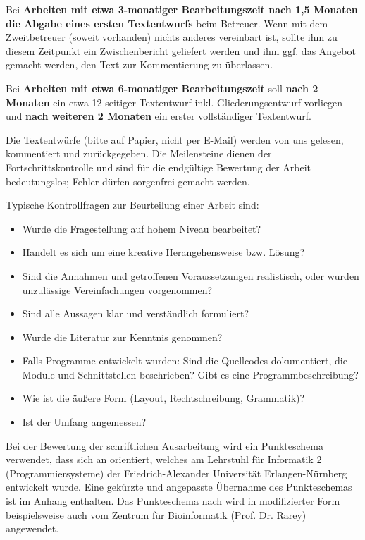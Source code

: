 \documentclass[12pt]{scrartcl}
\begin{document}
Bei \textbf{Arbeiten mit etwa 3-monatiger Bearbeitungszeit nach 1,5 Monaten die Abgabe eines ersten Textentwurfs} beim Betreuer. Wenn mit dem Zweitbetreuer (soweit vorhanden) nichts anderes vereinbart ist, sollte ihm zu diesem Zeitpunkt ein Zwischenbericht geliefert werden und ihm ggf. das Angebot gemacht werden, den Text zur Kommentierung zu überlassen.

Bei \textbf{Arbeiten mit etwa 6-monatiger Bearbeitungszeit} soll \textbf{nach 2 Monaten} ein etwa 12-seitiger Textentwurf inkl. Gliederungsentwurf vorliegen und \textbf{nach weiteren 2 Monaten} ein erster vollständiger Textentwurf. 

Die Textentwürfe (bitte auf Papier, nicht per E-Mail) werden von uns gelesen, kommentiert und zurückgegeben. Die Meilensteine dienen der Fortschrittskontrolle und sind für die endgültige Bewertung der Arbeit bedeutungslos; Fehler dürfen sorgenfrei gemacht werden.

Typische Kontrollfragen zur Beurteilung einer Arbeit sind:
\begin{itemize}
\item Wurde die Fragestellung auf hohem Niveau bearbeitet?
\item Handelt es sich um eine kreative Herangehensweise bzw. Lösung?
\item Sind die Annahmen und getroffenen Voraussetzungen realistisch, oder wurden unzulässige Vereinfachungen vorgenommen?
\item Sind alle Aussagen klar und verständlich formuliert?
\item Wurde die Literatur zur Kenntnis genommen?
\item Falls Programme entwickelt wurden: Sind die Quellcodes dokumentiert, die Module und Schnittstellen beschrieben? Gibt es eine Programmbeschreibung? 
\item Wie ist die äußere Form (Layout, Rechtschreibung, Grammatik)?
\item Ist der Umfang angemessen?
\end{itemize}

Bei der Bewertung der schriftlichen Ausarbeitung wird ein Punkteschema verwendet, dass sich an \cite{faui2} orientiert, welches am Lehrstuhl für Informatik 2 (Programmiersysteme) der Friedrich-Alexander Universität Erlangen-Nürnberg entwickelt wurde. Eine gekürzte und angepasste Übernahme des Punkteschemas ist im Anhang enthalten. Das Punkteschema nach \cite{faui2} wird in modifizierter Form beispielsweise auch vom Zentrum für Bioinformatik (Prof. Dr. Rarey) angewendet. 
\end{document}
